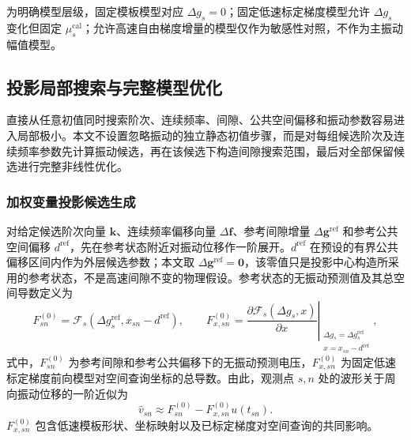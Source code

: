 \documentclass[UTF8,12pt,a4paper]{ctexart}
\newcommand{\Fsen}{\mathcal{F}}
\begin{document}
为明确模型层级，固定模板模型对应 $\Delta g_s=0$；固定低速标定梯度模型允许 $\Delta g_s$ 变化但固定 $\mu_s^{\mathrm{cal}}$；允许高速自由梯度增量的模型仅作为敏感性对照，不作为主振动幅值模型。

\subsection{投影局部搜索与完整模型优化}
\label{sec:candidate_solution}

直接从任意初值同时搜索阶次、连续频率、间隙、公共空间偏移和振动参数容易进入局部极小。本文不设置忽略振动的独立静态初值步骤，而是对每组候选阶次及连续频率参数先计算振动候选，再在该候选下构造间隙搜索范围，最后对全部保留候选进行完整非线性优化。

\subsubsection{加权变量投影候选生成}

对给定候选阶次向量 $\bm k$、连续频率偏移向量 $\Delta\bm f$、参考间隙增量 $\Delta\bm g^{\mathrm{ref}}$ 和参考公共空间偏移 $d^{\mathrm{ref}}$，先在参考状态附近对振动位移作一阶展开。$d^{\mathrm{ref}}$ 在预设的有界公共偏移区间内作为外层候选参数；本文取 $\Delta\bm g^{\mathrm{ref}}=\bm 0$，该零值只是投影中心构造所采用的参考状态，不是高速间隙不变的物理假设。参考状态的无振动预测值及其总空间导数定义为
\begin{equation}
F_{sn}^{(0)}
=\Fsen_s(\Delta g_s^{\mathrm{ref}},x_{sn}-d^{\mathrm{ref}}),
\qquad
F_{x,sn}^{(0)}=
\left.\frac{\partial\Fsen_s(\Delta g_s,x)}{\partial x}
\right|_{\substack{\Delta g_s=\Delta g_s^{\mathrm{ref}}\\
x=x_{sn}-d^{\mathrm{ref}}}},
\label{eq:local_derivative}
\end{equation}
式中，$F_{sn}^{(0)}$ 为参考间隙和参考公共偏移下的无振动预测电压，$F_{x,sn}^{(0)}$ 为固定低速标定梯度前向模型对空间查询坐标的总导数。由此，观测点 $s,n$ 处的波形关于周向振动位移的一阶近似为
\begin{equation}
\widehat v_{sn}
\approx F_{sn}^{(0)}-F_{x,sn}^{(0)}u(t_{sn}).
\label{eq:linearized_wave}
\end{equation}
$F_{x,sn}^{(0)}$ 包含低速模板形状、坐标映射以及已标定梯度对空间查询的共同影响。
\end{document}
